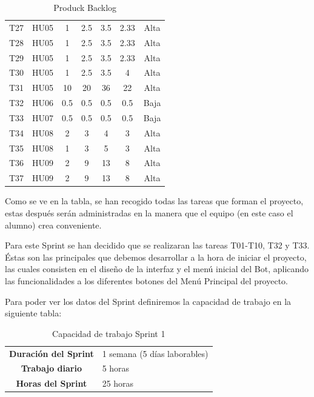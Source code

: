 \begin{table}[H]
\begin{center}
\begin{longtable}{| c | c | c | c | c | c | c |}
			T27 & HU05 & 1 & 2.5 & 3.5 & 2.33 & Alta \\
			T28 & HU05 & 1 & 2.5 & 3.5 & 2.33 & Alta \\
			T29 & HU05 & 1 & 2.5 & 3.5 & 2.33 & Alta \\
			T30 & HU05 & 1 & 2.5 & 3.5 & 4 & Alta \\		
			T31 & HU05 & 10 & 20 & 36 & 22 & Alta \\		
			T32 & HU06 & 0.5 & 0.5 & 0.5 & 0.5 & Baja \\
			T33 & HU07 & 0.5 & 0.5 & 0.5 & 0.5 & Baja \\
			T34 & HU08 & 2 & 3 & 4 & 3 & Alta \\
			T35 & HU08 & 1 & 3 & 5 & 3 & Alta \\
			T36 & HU09 & 2 & 9 & 13 & 8 & Alta \\
			T37 & HU09 & 2 & 9 & 13 & 8 & Alta \\ \hline
		\end{longtable}
		\caption{Produck Backlog}
	\end{center}
\end{table}

Como se ve en la tabla, se han recogido todas las tareas que forman el proyecto, estas después serán administradas en la manera que el equipo (en este caso el alumno) crea conveniente.

Para este Sprint se han decidido que se realizaran las tareas T01-T10, T32 y T33. Éstas son las principales que debemos desarrollar a la hora de iniciar el proyecto, las cuales consisten en el diseño de la interfaz y el menú inicial del Bot, aplicando las funcionalidades a los diferentes botones del Menú Principal del proyecto.

Para poder ver los datos del Sprint definiremos la capacidad de trabajo en la siguiente tabla:

\begin{table}[H]
	\begin{center}
		\begin{tabular}{| c | p{9cm} |}
			\hline
			
			\textbf{Duración del Sprint} & 1 semana (5 días laborables) \\
			\textbf{Trabajo diario} & 5 horas \\
			\textbf{Horas del Sprint} & 25 horas \\ \hline
		\end{tabular}
		\caption{Capacidad de trabajo Sprint 1}
	\end{center}
\end{table}

